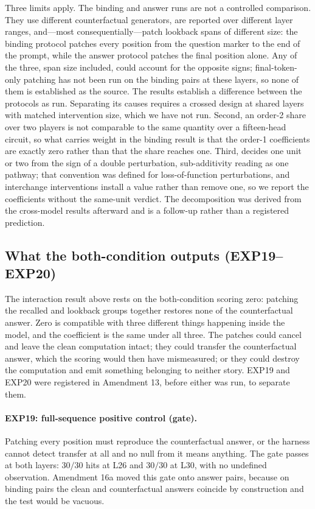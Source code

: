 \documentclass{article}
\begin{document}
Three limits apply. The binding and answer runs are not a controlled comparison. They use
different counterfactual generators, are reported over different layer ranges, and---most
consequentially---patch lookback spans of different size: the binding protocol patches every
position from the question marker to the end of the prompt, while the answer protocol patches
the final position alone. Any of the three, span size included, could
account for the opposite signs; final-token-only patching has not been run on the binding pairs
at these layers, so none of them is established as the source. The results establish a
difference between the protocols as run. Separating its causes requires a crossed design at
shared layers with matched intervention size, which we have not run. Second, an order-2 share over two players is
not comparable to the same quantity over a fifteen-head circuit, so what carries weight in the
binding result is that the order-1 coefficients are exactly zero rather than that the share
reaches one. Third, \citet{benzer1955}
decides one unit or two from the sign of a double perturbation, sub-additivity reading as one
pathway; that convention was defined for loss-of-function perturbations, and interchange
interventions install a value rather than remove one, so we report the coefficients without
the same-unit verdict. The decomposition was derived from the cross-model results afterward and is a
follow-up rather than a registered prediction.

\subsection{What the both-condition outputs (EXP19--EXP20)}
\label{sec:exp1920}

The interaction result above rests on the both-condition scoring zero: patching the recalled
and lookback groups together restores none of the counterfactual answer. Zero is compatible
with three different things happening inside the model, and the coefficient is the same under
all three. The patches could cancel and leave the clean computation intact; they could transfer
the counterfactual answer, which the scoring would then have mismeasured; or they could destroy
the computation and emit something belonging to neither story. EXP19 and EXP20 were registered
in Amendment 13, before either was run, to separate them.

\paragraph{EXP19: full-sequence positive control (gate).}
Patching every position must reproduce the counterfactual answer, or the harness cannot detect
transfer at all and no null from it means anything. The gate passes at both layers: $30/30$
hits at L26 and $30/30$ at L30, with no undefined observation. Amendment 16a moved this gate
onto answer pairs, because on binding pairs the clean and counterfactual answers coincide by
construction and the test would be vacuous.
\end{document}
